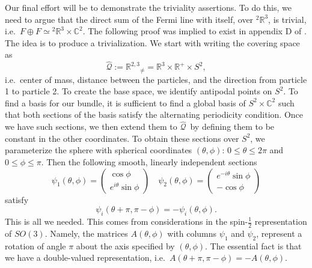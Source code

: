 \documentclass[11pt]{article}
\theoremstyle{remark}
\begin{document}
Our final effort will be to demonstrate the triviality assertions. To
do this, we need to argue that
the direct sum 
of the Fermi line with itself, over ${}^2\ensuremath{\mathbb{R}^{3}}$, is trivial, i.e.\
$F \oplus F \ensuremath{\simeq} {}^2\ensuremath{\mathbb{R}^{3}}\times \ensuremath{\mathbb{C}}^2 $. 
The following proof was implied to exist in appendix D of \cite{MR97}.  
The idea is to produce a trivialization. We start with writing the
covering space as
\[
 \ensuremath{\widehat{\ensuremath{\mathcal{Q}}}} \ensuremath{:=} \ensuremath{\mathbb{R}^{2,3}}_{\neq} = \ensuremath{\mathbb{R}^{3}} \times \ensuremath{\mathbb{R}^{+}} \times
 S^2,
\]  
i.e.\   center of mass, distance between the particles, and the
direction from particle 1 to particle 2. To create the base space, we
identify antipodal points on $S^2$.
To find a basis for our bundle, it is sufficient to find a global basis of
$S^2 \times \ensuremath{\mathbb{C}}^2$ such that both sections of the basis satisfy the
alternating periodicity condition. 
Once we have such sections, we then extend them to \ensuremath{\widehat{\ensuremath{\mathcal{Q}}}}\ by
defining them to be constant in the other coordinates.
To obtain these sections over $S^2$,
 we parameterize the sphere with spherical coordinates $(\theta, \phi)$:
 $0
\leq \theta \leq 2\pi$ and $0 
\leq \phi \leq \pi$. Then the following 
smooth, linearly independent sections 
\[
\ensuremath{\psi}_1 (\theta, \phi)= 
\begin{pmatrix}
\cos\phi\\
e^{i\theta}\sin\phi
\end{pmatrix}
\quad
\ensuremath{\psi}_2 (\theta, \phi) = 
\begin{pmatrix} 
e^{-i\theta} \sin\phi\\
-\cos\phi
\end{pmatrix}
\]
satisfy   
\[
\ensuremath{\psi}_i(\theta + \pi, \pi - \phi) = - \ensuremath{\psi}_i(\theta, \phi).
\] 
This is all we needed. This  comes from considerations in the
spin-$\frac{1}{2}$ representation of $SO(3)$. Namely, the matrices 
$A(\theta,
\phi)$ with columns $\ensuremath{\psi}_1$ and $\ensuremath{\psi}_2$, represent a
rotation of angle $\pi$ about the axis specified by $(\theta, \phi)$.
The essential fact is that we have a double-valued representation,
i.e.\  $A(\theta + \pi, \pi - \phi) = -A(\theta, \phi)$.
\end{document}
